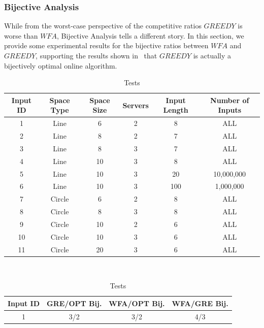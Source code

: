 \subsubsection*{Bijective Analysis}
While from the worst-case perspective of the competitive ratios $GREEDY$ is worse than $WFA$, Bijective Analysis tells a different story. In this section, we provide some experimental results for the bijective ratios between $WFA$ and $GREEDY$, supporting the results shown in~\cite{bij2016} that $GREEDY$ is actually a bijectively optimal online algorithm.


\begin{table}[!htb]
    \begin{minipage}{.5\linewidth}
      \centering
      \begin{tabular}{|c|c|c|c|c|c|}
        \hline
        Input ID & Space Type & Space Size & Servers & Input Length & Number of Inputs\\
        \hline
        1 & Line & 6 & 2 & 8 & ALL \\
        \hline
        2 & Line & 8 & 2 & 7 & ALL \\
        \hline
        3 & Line & 8 & 3 & 7 & ALL\\
        \hline
        4 & Line & 10 & 3 & 8 & ALL\\
        \hline
        5 & Line & 10 & 3 & 20 & 10,000,000\\
        \hline
        6 & Line & 10 & 3 & 100 & 1,000,000\\
        \hline 
        7 & Circle & 6 & 2 & 8 & ALL\\
        \hline
        8 & Circle & 8 & 3 & 8 & ALL\\
        \hline
        9 & Circle & 10 & 2 & 6 & ALL\\
        \hline
        10 & Circle & 10 & 3 & 6 & ALL\\
        \hline
        11 & Circle & 20 & 3 & 6 & ALL \\
        \hline
    \end{tabular}
        \caption{Tests}
        \label{tab:tests}
    \end{minipage}%
    \\
    \begin{minipage}{.5\linewidth}
        \centering
        \begin{tabular}{|c|c|c|c|}
          \hline
          Input ID & GRE/OPT Bij. & WFA/OPT Bij. & WFA/GRE Bij.\\
          \hline
          1 & 3/2 & 3/2 & 4/3\\

\end{tabular}
\end{minipage}
\end{table}

